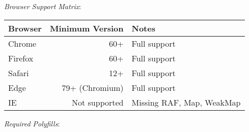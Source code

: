 \documentclass[11pt]{article}
\begin{document}
\emph{Browser Support Matrix}:

\begin{center}
\begin{tabular}{lrl}
Browser & Minimum Version & Notes\\
\hline
Chrome & 60+ & Full support\\
Firefox & 60+ & Full support\\
Safari & 12+ & Full support\\
Edge & 79+ (Chromium) & Full support\\
IE & Not supported & Missing RAF, Map, WeakMap\\
\end{tabular}
\end{center}

\emph{Required Polyfills}:
\end{document}
